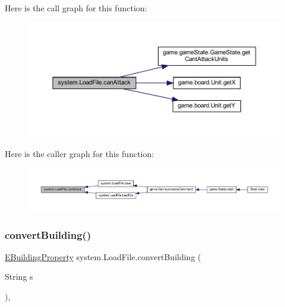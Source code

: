 Here is the call graph for this function\+:
\nopagebreak
\begin{figure}[H]
\begin{center}
\leavevmode
\includegraphics[width=350pt]{classsystem_1_1_load_file_aa76e99fc2bb6200c6905b151c0092b3b_cgraph}
\end{center}
\end{figure}
Here is the caller graph for this function\+:
\nopagebreak
\begin{figure}[H]
\begin{center}
\leavevmode
\includegraphics[width=350pt]{classsystem_1_1_load_file_aa76e99fc2bb6200c6905b151c0092b3b_icgraph}
\end{center}
\end{figure}
\mbox{\label{classsystem_1_1_load_file_a56e36ed0f74cf5fc59a938e42d38bf13}} 
\subsubsection{\texorpdfstring{convert\+Building()}{convertBuilding()}}
{\footnotesize\ttfamily \mbox{\hyperlink{enumrule_engine_1_1entity_1_1_e_building_property}{E\+Building\+Property}} system.\+Load\+File.\+convert\+Building (\begin{DoxyParamCaption}\item[{String}]{s }\end{DoxyParamCaption})\hspace{0.3cm}{\ttfamily [inline]}, {\ttfamily [private]}}

